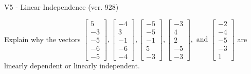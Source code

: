 \begin{exercise}
  \begin{exerciseTitle}V5 - Linear Independence (ver. 928)\end{exerciseTitle}
  \begin{exerciseStatement}
    Explain why the vectors \(\left[\begin{array}{r}
5 \\
-3 \\
-5 \\
-6 \\
-5
\end{array}\right] , \left[\begin{array}{r}
-4 \\
3 \\
-1 \\
-6 \\
-4
\end{array}\right] , \left[\begin{array}{r}
-5 \\
-5 \\
-1 \\
5 \\
-3
\end{array}\right] , \left[\begin{array}{r}
-3 \\
4 \\
2 \\
-5 \\
-3
\end{array}\right] , \text{ and } \left[\begin{array}{r}
-2 \\
-4 \\
-5 \\
-3 \\
1
\end{array}\right]\) are linearly dependent or linearly independent.	



\end{exerciseStatement}
\end{exercise}
